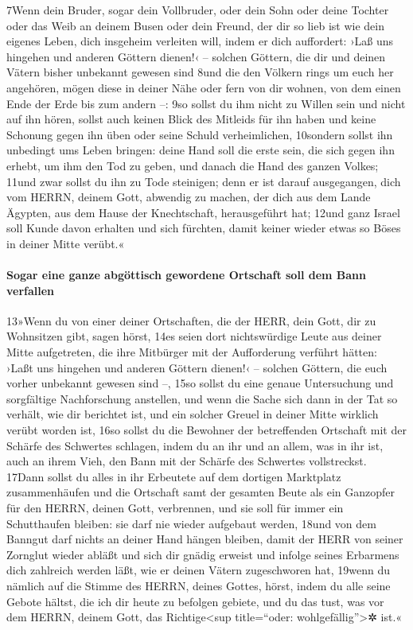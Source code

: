 7Wenn dein Bruder, sogar dein Vollbruder, oder dein Sohn oder deine
Tochter oder das Weib an deinem Busen oder dein Freund, der dir so lieb
ist wie dein eigenes Leben, dich insgeheim verleiten will, indem er dich
auffordert: ›Laß uns hingehen und anderen Göttern dienen!‹ -- solchen
Göttern, die dir und deinen Vätern bisher unbekannt gewesen sind 8und
die den Völkern rings um euch her angehören, mögen diese in deiner Nähe
oder fern von dir wohnen, von dem einen Ende der Erde bis zum andern --:
9so sollst du ihm nicht zu Willen sein und nicht auf ihn hören, sollst
auch keinen Blick des Mitleids für ihn haben und keine Schonung gegen
ihn üben oder seine Schuld verheimlichen, 10sondern sollst ihn unbedingt
ums Leben bringen: deine Hand soll die erste sein, die sich gegen ihn
erhebt, um ihm den Tod zu geben, und danach die Hand des ganzen Volkes;
11und zwar sollst du ihn zu Tode steinigen; denn er ist darauf
ausgegangen, dich vom HERRN, deinem Gott, abwendig zu machen, der dich
aus dem Lande Ägypten, aus dem Hause der Knechtschaft, herausgeführt
hat; 12und ganz Israel soll Kunde davon erhalten und sich fürchten,
damit keiner wieder etwas so Böses in deiner Mitte verübt.«

\hypertarget{sogar-eine-ganze-abguxf6ttisch-gewordene-ortschaft-soll-dem-bann-verfallen}{%
\paragraph{Sogar eine ganze abgöttisch gewordene Ortschaft soll dem Bann
verfallen}\label{sogar-eine-ganze-abguxf6ttisch-gewordene-ortschaft-soll-dem-bann-verfallen}}

13»Wenn du von einer deiner Ortschaften, die der HERR, dein Gott, dir zu
Wohnsitzen gibt, sagen hörst, 14es seien dort nichtswürdige Leute aus
deiner Mitte aufgetreten, die ihre Mitbürger mit der Aufforderung
verführt hätten: ›Laßt uns hingehen und anderen Göttern dienen!‹ --
solchen Göttern, die euch vorher unbekannt gewesen sind --, 15so sollst
du eine genaue Untersuchung und sorgfältige Nachforschung anstellen, und
wenn die Sache sich dann in der Tat so verhält, wie dir berichtet ist,
und ein solcher Greuel in deiner Mitte wirklich verübt worden ist, 16so
sollst du die Bewohner der betreffenden Ortschaft mit der Schärfe des
Schwertes schlagen, indem du an ihr und an allem, was in ihr ist, auch
an ihrem Vieh, den Bann mit der Schärfe des Schwertes vollstreckst.
17Dann sollst du alles in ihr Erbeutete auf dem dortigen Marktplatz
zusammenhäufen und die Ortschaft samt der gesamten Beute als ein
Ganzopfer für den HERRN, deinen Gott, verbrennen, und sie soll für immer
ein Schutthaufen bleiben: sie darf nie wieder aufgebaut werden, 18und
von dem Banngut darf nichts an deiner Hand hängen bleiben, damit der
HERR von seiner Zornglut wieder abläßt und sich dir gnädig erweist und
infolge seines Erbarmens dich zahlreich werden läßt, wie er deinen
Vätern zugeschworen hat, 19wenn du nämlich auf die Stimme des HERRN,
deines Gottes, hörst, indem du alle seine Gebote hältst, die ich dir
heute zu befolgen gebiete, und du das tust, was vor dem HERRN, deinem
Gott, das Richtige\textless sup title=``oder:
wohlgefällig''\textgreater✲ ist.«

